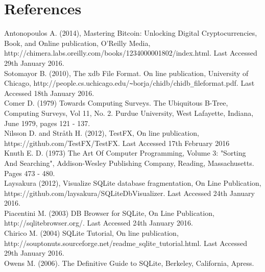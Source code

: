 \section*{References}
\label{sec:references}

	

\begin{thebibliography}{0}

Antonopoulos A. (2014), Mastering Bitcoin: Unlocking Digital Cryptocurrencies, Book, and Online publication, O'Reilly Media, http://chimera.labs.oreilly.com/books/1234000001802/index.html. Last Accessed 29th January 2016.
\\
Sotomayor B. (2010), The xdb File Format. On line publication, University of Chicago, http://people.cs.uchicago.edu/\verb|~|borja/chidb/chidb\verb|_|fileformat.pdf. Last Accessed 18th January 2016.
\\
Comer D. (1979) Towards Computing Surveys. The Ubiquitous B-Tree, Computing Surveys, Vol 11, No. 2. Purdue University, West Lafayette, Indiana, June 1979, pages 121 - 137.
\\
Nilsson D. and Stråth H. (2012), TestFX, On line publication, https://github.com/TestFX/TestFX. Last Accessed 17th February 2016
\\
Knuth E. D. (1973) The Art Of Computer Programming, Volume 3: "Sorting And Searching", Addison-Wesley Publishing Company, Reading, Massachusetts. Pages 473 - 480.
\\
Laysakura (2012), Visualize SQLite database fragmentation, On Line Publication, https://github.com/laysakura/SQLiteDbVisualizer. Last Accessed 24th January 2016.
\\
Piacentini M. (2003) DB Browser for SQLite, On Line Publication, http://sqlitebrowser.org/. Last Accessed 24th January 2016.
\\
Chirico M. (2004) SQLite Tutorial, On line publication, http://souptonuts.sourceforge.net/readme\verb|_|sqlite\verb|_|tutorial.html. Last Accessed 29th January 2016.
\\
Owens M. (2006). The Definitive Guide to SQLite, Berkeley, California, Apress. 
\\

\end{thebibliography}

